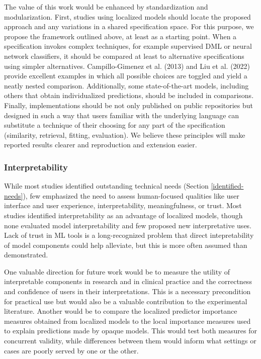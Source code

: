 \documentclass{article}
\begin{document}
The value of this work would be enhanced by standardization and
modularization. First, studies using localized models should locate the
proposed approach and any variations in a shared specification space.
For this purpose, we propose the framework outlined above, at least as a
starting point. When a specification invokes complex techniques, for
example supervised DML or neural network classifiers, it should be
compared at least to alternative specifications using simpler
alternatives. Campillo-Gimenez et al. (2013) and Liu et al. (2022)
provide excellent examples in which all possible choices are toggled and
yield a neatly nested comparison. Additionally, some state-of-the-art
models, including others that obtain individualized predictions, should
be included in comparisons. Finally, implementations should be not only
published on public repositories but designed in such a way that users
familiar with the underlying language can substitute a technique of
their choosing for any part of the specification (similarity, retrieval,
fitting, evaluation). We believe these principles will make reported
results clearer and reproduction and extension easier.

\hypertarget{interpretability}{%
\subsubsection{Interpretability}\label{interpretability}}

While most studies identified outstanding technical needs (Section
\ref{identified-needs}), few emphasized the need to assess human-focused
qualities like user interface and user experience, interpretability,
meaningfulness, or trust. Most studies identified interpretability as an
advantage of localized models, though none evaluated model
interpretability and few proposed new interpretative uses. Lack of trust
in ML tools is a long-recognized problem that direct intepretability of
model components could help alleviate, but this is more often assumed
than demonstrated.

One valuable direction for future work would be to measure the utility
of interpretable components in research and in clinical practice and the
correctness and confidence of users in their interpretations. This is a
necessary precondition for practical use but would also be a valuable
contribution to the experimental literature. Another would be to compare
the localized predictor importance measures obtained from localized
models to the local importance measures used to explain predictions made
by opaque models. This would test both measures for concurrent validity,
while differences between them would inform what settings or cases are
poorly served by one or the other.
\end{document}
